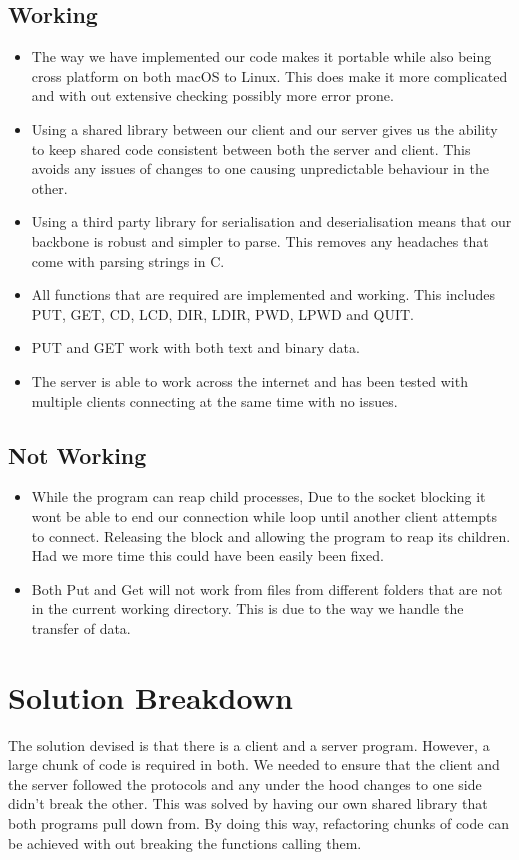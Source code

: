 \documentclass{article}
\begin{document}
\subsection{Working}
\begin{itemize}
\item The way we have implemented our code makes it portable while also being cross platform on both macOS to Linux. This does make it more complicated and with out extensive checking possibly more error prone.
\item Using a shared library between our client and our server gives us the ability to keep shared code consistent between both the server and client. This avoids any issues of changes to one causing unpredictable behaviour in the other.
\item Using a third party library for serialisation and deserialisation means that our backbone is robust and simpler to parse. This removes any headaches that come with parsing strings in C.
\item All functions that are required are implemented and working. This includes PUT, GET, CD, LCD, DIR, LDIR, PWD, LPWD and QUIT.
\item PUT and GET work with both text and binary data.
\item The server is able to work across the internet and has been tested with multiple clients connecting at the same time with no issues.
\end{itemize}

\subsection{Not Working}
\begin{itemize}
    \item While the program can reap child processes, Due to the socket blocking it wont be able to end our connection while loop until another client attempts to connect. Releasing the block and allowing the program to reap its children. Had we more time this could have been easily been fixed.
    \item Both Put and Get will not work from files from different folders that are not in the current working directory. This is due to the way we handle the transfer of data.
\end{itemize}

\section{Solution Breakdown}
The solution devised is that there is a client and a server program. However, a large chunk of code is required in both. We needed to ensure that the client and the server followed the protocols and any under the hood changes to one side didn't break the other. This was solved by having our own shared library that both programs pull down from. By doing this way, refactoring chunks of code can be achieved with out breaking the functions calling them.\\
\end{document}
